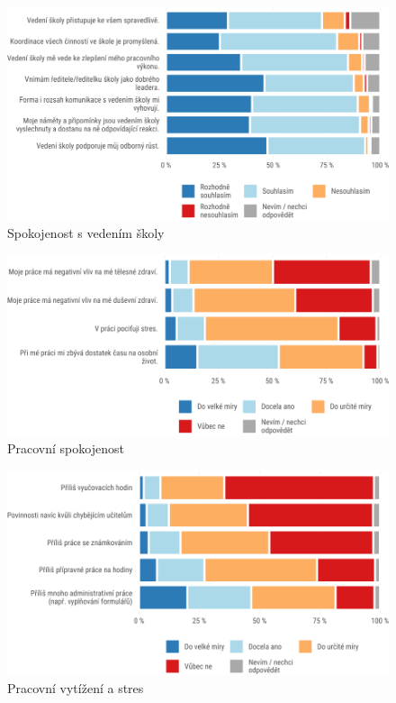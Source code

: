 \documentclass[12pt,a4paper,]{report}
\begin{document}
\begin{figure}

{\centering \includegraphics[width=\textwidth]{figs/tots4q3leaderappdx-1} 

}

\caption{Spokojenost s vedením školy}\label{fig:tots4q3leaderappdx}
\end{figure}

\begin{figure}

{\centering \includegraphics[width=\textwidth]{figs/tots6q1T3WELSappdx-1} 

}

\caption{Pracovní spokojenost}\label{fig:tots6q1T3WELSappdx}
\end{figure}

\begin{figure}

{\centering \includegraphics[width=\textwidth]{figs/tots6q2T3WLOADappdx-1} 

}

\caption{Pracovní vytížení a stres}\label{fig:tots6q2T3WLOADappdx}
\end{figure}
\end{document}
